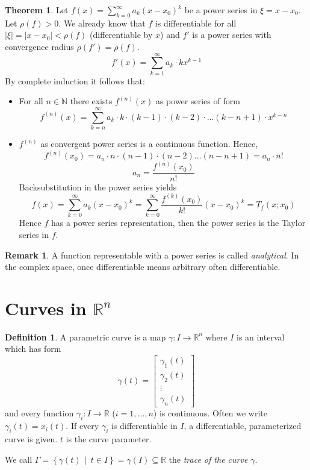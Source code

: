 \documentclass[a4paper,landscape,twocolumn]{article}
\theoremstyle{definition}
\newtheorem{theorem}{Theorem}
\newtheorem{defi}{Definition}
\newtheorem{rem}{Remark}
\newcommand\setdef[2]{\left\{#1\,\middle|\,#2\right\}}
\newcommand\abs[1]{\left|#1\right|}
\begin{document}
\begin{theorem}
  Let $f(x) = \sum_{k=0}^\infty a_k (x - x_0)^k$ be a power series in $\xi = x - x_0$.
  Let $\rho(f) > 0$. We already know that $f$ is differentiable for all $\abs{\xi} = \abs{x - x_0} < \rho(f)$ (differentiable by $x$) and $f'$ is a power series with convergence radius $\rho(f') = \rho(f)$.
  \[ f'(x) = \sum_{k=1}^\infty a_k \cdot k x^{k-1} \]
  By complete induction it follows that:
  \begin{itemize}
    \item For all $n \in \mathbb N$ there exists $f^{(n)}(x)$ as power series of form
      \[
        f^{(n)}(x)
        = \sum_{k=n}^\infty a_k \cdot k \cdot (k-1) \cdot (k-2)
          \cdot \ldots (k-n+1) \cdot x^{k-n}
      \]
    \item
      $f^{(n)}$ as convergent power series is a continuous function. Hence,
      \[ f^{(n)}(x_0) = a_n \cdot n \cdot (n-1) \cdot (n-2) \ldots (n-n+1) = a_n \cdot n! \]
      \[ a_n = \frac{f^{(n)}(x_0)}{n!} \]
      Backsubstitution in the power series yields
      \[
        f(x) = \sum_{k=0}^\infty a_k (x - x_0)^k
          = \sum_{k=0}^\infty \frac{f^{(k)}(x_0)}{k!} (x - x_0)^k
          = T_f(x; x_0)
      \]
      Hence $f$ has a power series representation, then the power series is the Taylor series in $f$.
  \end{itemize}
\end{theorem}

\begin{rem}
  A function representable with a power series is called \emph{analytical}.
  In the complex space, once differentiable means arbitrary often differentiable.
\end{rem}

\section{Curves in $\mathbb R^n$}
%
\begin{defi}
  A parametric curve is a map $\gamma: I \to \mathbb R^n$ where $I$ is an interval which has form
  \[
    \gamma(t) = \begin{bmatrix}
      \gamma_1(t) \\
      \gamma_2(t) \\
      \vdots \\
      \gamma_n(t)
    \end{bmatrix}
  \]
  and every function $\gamma_i: I \to \mathbb R$ ($i = 1, \ldots, n$) is continuous.
  Often we write $\gamma_i(t) = x_i(t)$.
  If every $\gamma_i$ is differentiable in $I$, a differentiable, parameterized curve
  is given. $t$ is the curve parameter.

  We call $\Gamma = \setdef{\gamma(t)}{t \in I} = \gamma(I) \subseteq \mathbb R$
  the \emph{trace of the curve $\gamma$}.
\end{defi}
\end{document}
